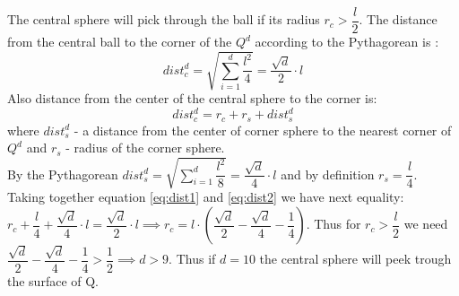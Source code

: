 The central sphere will pick through the ball if its radius $r_c > \dfrac{l}{2}$.
The distance from the central ball to the corner of the $Q^d$ according to the 
Pythagorean is :
\begin{equation}
dist^d_c = \sqrt{\sum_{i=1}^d \dfrac{l^2}{4}} = \dfrac{\sqrt{d}}{2} \cdot l\label{eq:dist1}
\end{equation}
Also distance from the center of the central sphere to the corner is:
\begin{equation}
dist^d_c = r_c + r_s + dist_s^d\label{eq:dist2}
\end{equation}
where $dist_s^d$ - a distance from the center of corner sphere to the nearest corner of $Q^d$ and
			$r_s$ - radius of the corner sphere.\\
By the Pythagorean $dist_s^d = \sqrt{\sum_{i=1}^d \dfrac{l^2}{8}} = \dfrac{\sqrt{d}}{4}\cdot l$ 
and by definition $r_s = \dfrac{l}{4}$. Taking together equation \eqref{eq:dist1} and \eqref{eq:dist2} we have next equality:
$r_c + \dfrac{l}{4} + \dfrac{\sqrt{d}}{4}\cdot l = \dfrac{\sqrt{d}}{2} \cdot l \implies r_c = l\cdot \left(\dfrac{\sqrt{d}}{2} - \dfrac{\sqrt{d}}{4} - \dfrac{1}{4} \right)$. Thus for $r_c > \dfrac{l}{2}$ we need 
$\dfrac{\sqrt{d}}{2} - \dfrac{\sqrt{d}}{4} - \dfrac{1}{4} > \dfrac{1}{2} \implies d > 9$. Thus if $d = 10$ 
the central sphere will peek trough the surface of Q. 